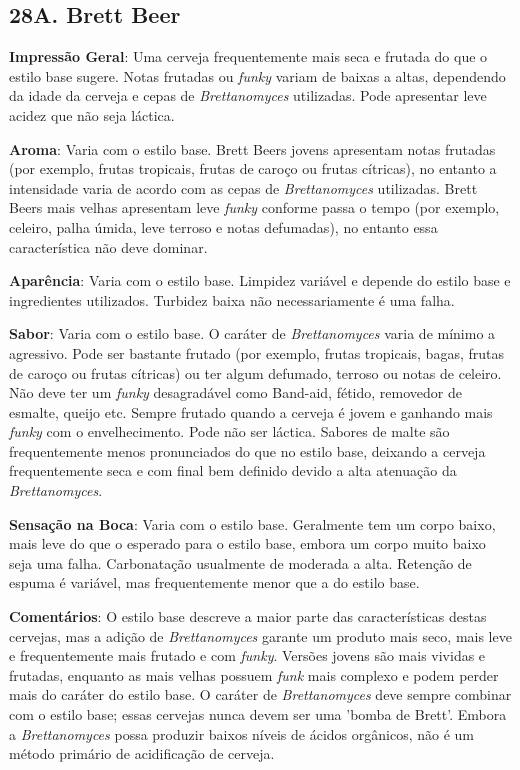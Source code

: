 \subsection*{28A. Brett Beer}
\textbf{Impressão Geral}: Uma cerveja frequentemente mais seca e frutada do que o estilo base sugere. Notas frutadas ou \textit{funky} variam de baixas a altas, dependendo da idade da cerveja e cepas de \textit{Brettanomyces} utilizadas. Pode apresentar leve acidez que não seja láctica.

\textbf{Aroma}: Varia com o estilo base. Brett Beers jovens apresentam notas frutadas (por exemplo, frutas tropicais, frutas de caroço ou frutas cítricas), no entanto a intensidade varia de acordo com as cepas de \textit{Brettanomyces} utilizadas. Brett Beers mais velhas apresentam leve \textit{funky} conforme passa o tempo (por exemplo, celeiro, palha úmida, leve terroso e notas defumadas), no entanto essa característica não deve dominar.

\textbf{Aparência}: Varia com o estilo base. Limpidez variável e depende do estilo base e ingredientes utilizados. Turbidez baixa não necessariamente é uma falha.

\textbf{Sabor}: Varia com o estilo base. O caráter de \textit{Brettanomyces} varia de mínimo a agressivo. Pode ser bastante frutado (por exemplo, frutas tropicais, bagas, frutas de caroço ou frutas cítricas) ou ter algum defumado, terroso ou notas de celeiro. Não deve ter um \textit{funky} desagradável como Band-aid, fétido, removedor de esmalte, queijo etc. Sempre frutado quando a cerveja é jovem e ganhando mais \textit{funky} com o envelhecimento. Pode não ser láctica. Sabores de malte são frequentemente menos pronunciados do que no estilo base, deixando a cerveja frequentemente seca e com final bem definido devido a alta atenuação da \textit{Brettanomyces}.

\textbf{Sensação na Boca}: Varia com o estilo base. Geralmente tem um corpo baixo, mais leve do que o esperado para o estilo base, embora um corpo muito baixo seja uma falha. Carbonatação usualmente de moderada a alta. Retenção de espuma é variável, mas frequentemente menor que a do estilo base.

\textbf{Comentários}: O estilo base descreve a maior parte das características destas cervejas, mas a adição de \textit{Brettanomyces} garante um produto mais seco, mais leve e frequentemente mais frutado e com \textit{funky}. Versões jovens são mais vividas e frutadas, enquanto as mais velhas possuem \textit{funk} mais complexo e podem perder mais do caráter do estilo base. O caráter de \textit{Brettanomyces} deve sempre combinar com o estilo base; essas cervejas nunca devem ser uma 'bomba de Brett'. Embora a \textit{Brettanomyces} possa produzir baixos níveis de ácidos orgânicos, não é um método primário de acidificação de cerveja.

